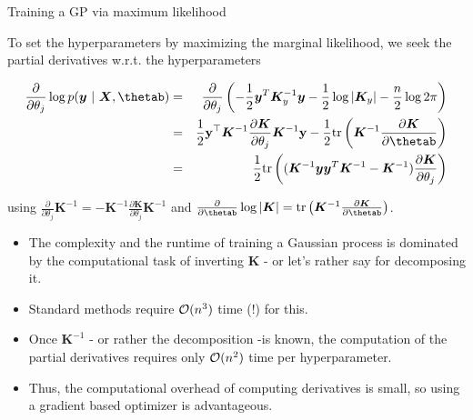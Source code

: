 \begin{vbframe}{Training a GP via maximum likelihood}

To set the hyperparameters by maximizing the marginal likelihood, we seek the partial derivatives w.r.t. the hyperparameters

\begin{footnotesize}
\begin{eqnarray*}
\frac{\partial}{\partial\theta_j} \log p(\bm{y} ~|~ \bm{X}, \thetab) &=& \frac{\partial}{\partial\theta_j}  \left(-\frac{1}{2}\bm{y}^T\bm{K}_y^{-1} \bm{y} - \frac{1}{2} \log \left| \bm{K}_y \right| - \frac{n}{2} \log 2\pi\right) \\ 
&=&\frac{1}{2} \ydat^\top \bm{K}^{-1} \frac{\partial \bm{K}}{\partial \theta_j}\bm{K}^{-1} \ydat - \frac{1}{2} \text{tr}\left(\bm{K}^{-1} \frac{\partial \bm{K}}{\partial \thetab} \right) \\
&=& \frac{1}{2} \text{tr}\left((\bm{K}^{-1}\bm{y}\bm{y}^T\bm{K}^{-1} - \bm{K}^{-1})\frac{\partial\bm{K}}{\partial\theta_j}\right)
\end{eqnarray*}
\end{footnotesize}

using $\frac{\partial}{\partial \theta_j} \bm{K}^{-1} = - \bm{K}^{-1} \frac{\partial \bm{K}}{\partial \theta_j}\bm{K}^{-1}$ and $\frac{\partial}{\partial \thetab} \log  |\bm{K}| = \text{tr}\left(\bm{K}^{-1} \frac{\partial \bm{K}}{\partial \thetab} \right)$. 

\framebreak

\begin{itemize}
  \item The complexity and the runtime of training a Gaussian process is dominated by the computational task of inverting $\bm{K}$ - or let's rather say for decomposing it.
  \item Standard methods require $\mathcal{O}(n^3)$ time (!) for this.
  \item Once $\bm{K}^{-1}$ - or rather the decomposition -is known, the computation of the partial derivatives requires only $\mathcal{O}(n^2)$ time per hyperparameter.
  \item  Thus, the computational overhead of computing derivatives is small, so using a gradient based optimizer is advantageous. 
\end{itemize} 


\framebreak 


\end{vbframe}
